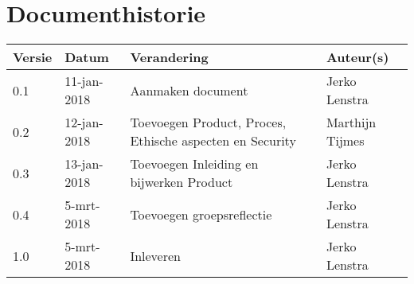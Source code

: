 \section{Documenthistorie}

\begin{tabularx}{\textwidth}{| l | l | X | l |}
    \hline
    \textbf{Versie} & \textbf{Datum} & \textbf{Verandering} & \textbf{Auteur(s)}
    \\ \hline
    0.1	& 11-jan-2018 & Aanmaken document & Jerko Lenstra \\ \hline
    0.2 & 12-jan-2018 & Toevoegen Product, Proces, Ethische aspecten en Security
     & Marthijn Tijmes \\ \hline
    0.3 & 13-jan-2018 & Toevoegen Inleiding en bijwerken Product & Jerko Lenstra \\ \hline
    0.4 & 5-mrt-2018 & Toevoegen groepsreflectie & Jerko Lenstra \\ \hline
    1.0 & 5-mrt-2018 & Inleveren & Jerko Lenstra \\ \hline

\end{tabularx}

